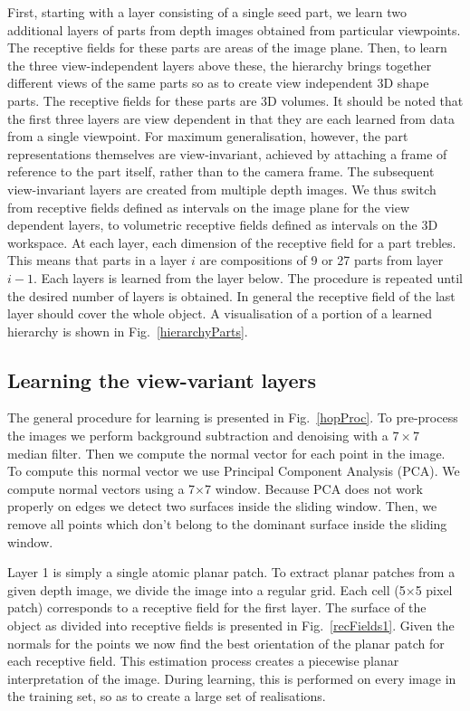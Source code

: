 \documentclass[letterpaper,10pt,conference]{ieeeconf}  %
\begin{document}
First, starting with a layer consisting of a single seed part, we learn two additional layers of parts from depth images obtained from particular viewpoints. The receptive fields for these parts are areas of the image plane. Then, to learn the three view-independent layers above these, the hierarchy brings together different views of the same parts so as to create view independent 3D shape parts. The receptive fields for these parts are 3D volumes. It should be noted that the first three layers are view dependent in that they are each learned from data from a single viewpoint. For maximum generalisation, however, the part representations themselves are view-invariant, achieved by attaching a frame of reference to the part itself, rather than to the camera frame.  The subsequent view-invariant layers are created from multiple depth images. We thus switch from receptive fields defined as intervals on the image plane for the view dependent layers, to volumetric receptive fields defined as intervals on the 3D workspace. At each layer, each dimension of the receptive field for a part trebles. This means that parts in a layer $i$ are compositions of 9 or 27 parts from layer $i-1$.  Each layers is learned from the layer below. The procedure is repeated until the desired number of layers is obtained. In general the receptive field of the last layer should cover the whole object. A visualisation of a portion of a learned hierarchy is shown in Fig.~\ref{hierarchyParts}.  

\subsection{Learning the view-variant layers}

The general procedure for learning is presented in Fig.~\ref{hopProc}. To pre-process the images we perform background subtraction and denoising with a $7 \times 7$ median filter.  Then we compute the normal vector for each point in the image. To compute this normal vector we use Principal Component Analysis (PCA). We compute normal vectors using a 7$\times$7 window. Because PCA does not work properly on edges we detect two surfaces inside the sliding window. Then, we remove all points which don't belong to the dominant surface inside the sliding window.

Layer 1 is simply a single atomic planar patch. To extract planar patches from a given depth image, we divide the image into a regular grid. Each cell (5$\times$5 pixel patch) corresponds to a receptive field for the first layer. The surface of the object as divided into receptive fields is presented in Fig.~\ref{recFields1}. Given the normals for the points we now find the best orientation of the planar patch for each receptive field.  This estimation process creates a piecewise planar interpretation of the image. During learning, this is performed on every image in the training set, so as to create a large set of realisations.
\end{document}
